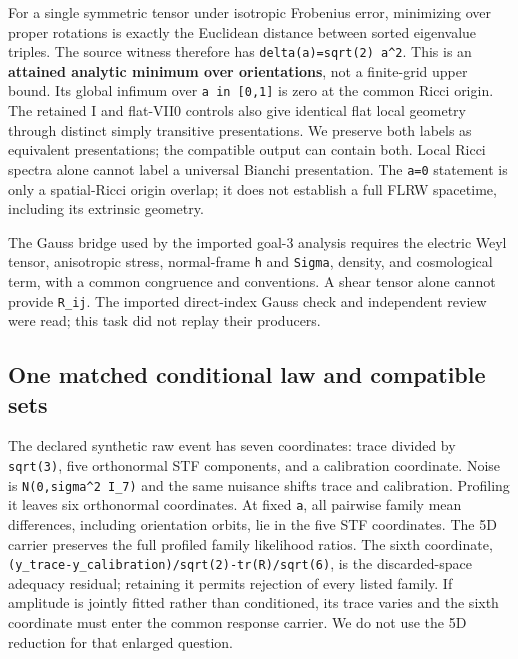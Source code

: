 \documentclass[
]{article}
\begin{document}
For a single symmetric tensor under isotropic Frobenius error,
minimizing over proper rotations is exactly the Euclidean distance
between sorted eigenvalue triples. The source witness therefore has
\texttt{delta(a)=sqrt(2)\ a\^{}2}. This is an \textbf{attained analytic
minimum over orientations}, not a finite-grid upper bound. Its global
infimum over \texttt{a\ in\ {[}0,1{]}} is zero at the common Ricci
origin. The retained I and flat-VII0 controls also give identical flat
local geometry through distinct simply transitive presentations. We
preserve both labels as equivalent presentations; the compatible output
can contain both. Local Ricci spectra alone cannot label a universal
Bianchi presentation. The \texttt{a=0} statement is only a spatial-Ricci
origin overlap; it does not establish a full FLRW spacetime, including
its extrinsic geometry.

The Gauss bridge used by the imported goal-3 analysis requires the
electric Weyl tensor, anisotropic stress, normal-frame \texttt{h} and
\texttt{Sigma}, density, and cosmological term, with a common congruence
and conventions. A shear tensor alone cannot provide \texttt{R\_ij}. The
imported direct-index Gauss check and independent review were read; this
task did not replay their producers.

\hypertarget{one-matched-conditional-law-and-compatible-sets}{%
\subsection{One matched conditional law and compatible
sets}\label{one-matched-conditional-law-and-compatible-sets}}

The declared synthetic raw event has seven coordinates: trace divided by
\texttt{sqrt(3)}, five orthonormal STF components, and a calibration
coordinate. Noise is \texttt{N(0,sigma\^{}2\ I\_7)} and the same
nuisance shifts trace and calibration. Profiling it leaves six
orthonormal coordinates. At fixed \texttt{a}, all pairwise family mean
differences, including orientation orbits, lie in the five STF
coordinates. The 5D carrier preserves the full profiled family
likelihood ratios. The sixth coordinate,
\texttt{(y\_trace-y\_calibration)/sqrt(2)-tr(R)/sqrt(6)}, is the
discarded-space adequacy residual; retaining it permits rejection of
every listed family. If amplitude is jointly fitted rather than
conditioned, its trace varies and the sixth coordinate must enter the
common response carrier. We do not use the 5D reduction for that
enlarged question.
\end{document}
